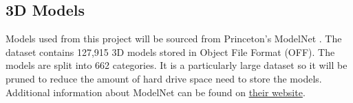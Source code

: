 \subsection{3D Models}
\label{subsec:3dmodels}
Models used from this project will be sourced from Princeton's ModelNet \cite{volumetricshapesmodeldataset}. The dataset contains 127,915 3D models stored in Object File Format (OFF). The models are split into 662 categories. It is a particularly large dataset so it will be pruned to reduce the amount of hard drive space need to store the models. Additional information about ModelNet can be found on \href{https://modelnet.cs.princeton.edu/}{their website}.